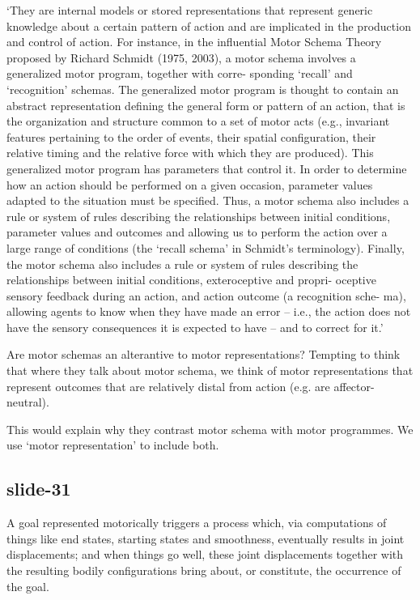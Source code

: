 \documentclass[12pt,\papersize]{extarticle}
\begin{document}
‘They are internal models or stored representations that represent generic knowledge
about a certain pattern of action and are implicated in the production and control of
action. For instance, in the influential Motor Schema Theory proposed by Richard Schmidt
(1975, 2003), a motor schema involves a generalized motor program, together with corre-
sponding ‘recall’ and ‘recognition’ schemas. The generalized motor program is thought to
contain an abstract representation defining the general form or pattern of an action,
that is the organization and structure common to a set of motor acts (e.g., invariant
features pertaining to the order of events, their spatial configuration, their relative
timing and the relative force with which they are produced). This generalized motor
program has parameters that control it. In order to determine how an action should be
performed on a given occasion, parameter values adapted to the situation must be
specified. Thus, a motor schema also includes a rule or system of rules describing the
relationships between initial conditions, parameter values and outcomes and allowing us
to perform the action over a large range of conditions (the ‘recall schema’ in Schmidt’s
terminology). Finally, the motor schema also includes a rule or system of rules
describing the relationships between initial conditions, exteroceptive and propri-
oceptive sensory feedback during an action, and action outcome (a recognition sche- ma),
allowing agents to know when they have made an error – i.e., the action does not have
the sensory consequences it is expected to have – and to correct for it.’
 
Are motor schemas an alterantive to motor representations? Tempting to think that where
they talk about motor schema, we think of motor representations that represent outcomes
that are relatively distal from action (e.g. are affector-neutral).
 
This would explain why they contrast motor schema with motor programmes. We use ‘motor
representation’ to include both.
 
\subsection{slide-31}
A goal represented motorically triggers a process which, via computations of things
like end states, starting states and smoothness, eventually results in joint
displacements; and when things go well, these joint displacements together with the
resulting bodily configurations bring about, or constitute, the occurrence of the goal.
 
\end{document}
